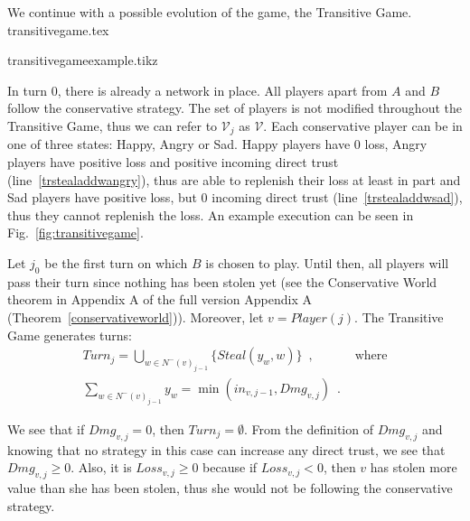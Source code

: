   We continue with a possible evolution of the game, the Transitive Game. 
  {transitivegame.tex}

  {transitivegameexample.tikz}
  
  \noindent In turn 0, there is already a network in place. All players apart from $A$ and $B$ follow the conservative
  strategy. The set of players is not modified throughout the Transitive Game, thus we can refer to $\mathcal{V}_j$ as
  $\mathcal{V}$. Each conservative player can be in one of three states: Happy, Angry or Sad. Happy players have 0 loss, Angry
  players have positive loss and positive incoming direct trust (line~\ref{trstealaddwangry}), thus are able to replenish
  their loss at least in part and Sad players have positive loss, but 0 incoming direct trust (line~\ref{trstealaddwsad}),
  thus they cannot replenish the loss. An example execution can be seen in Fig.~\ref{fig:transitivegame}.

  \noindent Let $j_0$ be the first turn on which $B$ is chosen to play. Until then, all players will pass their turn since
  nothing has been stolen yet (see \ifdefined\proceedings the Conservative World theorem in Appendix A of the full version
  \cite{trustisrisk}\else Appendix A (Theorem~\ref{conservativeworld})\fi). Moreover, let $v = Player(j)$. The Transitive
  Game generates turns:
  \begin{align}
     Turn_j = \bigcup\limits_{w \in N^{-}\left(v\right)_{j-1}}\{Steal\left(y_w,w\right)\} \enspace, & \mbox{ where} \\
     \sum\limits_{w \in N^{-}\left(v\right)_{j-1}}y_w = \min\left(in_{v, j-1}, Dmg_{v, j}\right) \enspace. &
  \end{align}
 
  \noindent We see that if $Dmg_{v, j} = 0$, then $Turn_j = \emptyset$. From the definition of $Dmg_{v,j}$ and knowing that no
  strategy in this case can increase any direct trust, we see that $Dmg_{v,j} \geq 0$. Also, it is $Loss_{v,j} \geq 0$ because
  if $Loss_{v,j} < 0$, then $v$ has stolen more value than she has been stolen, thus she would not be following the
  conservative strategy.
